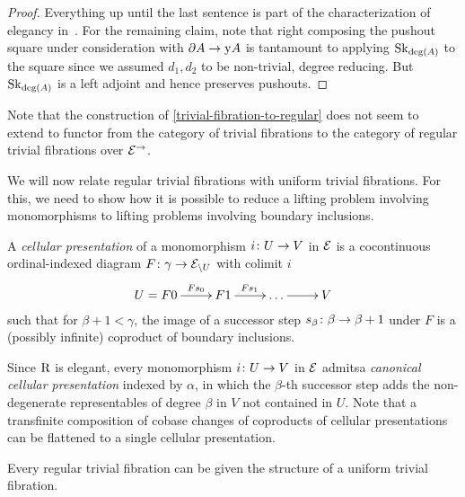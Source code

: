 \documentclass[reqno,10pt,a4paper,oneside,draft]{amsart}
\begin{document}
\begin{proof}
Everything up until the last sentence is part of the characterization of elegancy in~\cite[Proposition~3.8]{bergner-rezk-elegant}.
For the remaining claim, note that right composing the pushout square under consideration with $\partial A \to \mathrm{y} A$ is tantamount to applying $\operatorname{Sk}_{\deg(A)}$ to the square since we assumed $d_1, d_2$ to be non-trivial, \ie degree reducing.
But $\operatorname{Sk}_{\deg(A)}$ is a left adjoint and hence preserves pushouts.
\end{proof}

Note that the construction of \cref{trivial-fibration-to-regular} does not seem to extend to functor from the category of trivial fibrations to the category of regular trivial fibrations over $\mathcal{E}^{\to}$.

\medskip

We will now relate regular trivial fibrations with uniform trivial fibrations.
For this, we need to show how it is possible to reduce a lifting problem involving monomorphisms to lifting problems involving boundary inclusions.

\begin{definition} A \emph{cellular presentation} of a monomorphism $i \colon U \to V$ in $\mathcal{E}$ is a cocontinuous ordinal-indexed diagram $F \colon \gamma \to \mathcal{E}_{\backslash U}$ with colimit $i$
\[
\xymatrix{
  U = F 0
  \ar[r]^-{F s_0}
&
  F 1
  \ar[r]^{F s_1}
&
  \ldots
  \ar[r]
&
  V
}
\]
such that for $\beta + 1 < \gamma$, the image of a successor step $s_{\beta} \colon \beta \to \beta + 1$ under $F$ is a (possibly infinite) coproduct of boundary inclusions.
\end{definition}

Since $\mathrm{R}$ is elegant, every monomorphism $i \colon U \to V$ in $\mathcal{E}$ admitsa \emph{canonical cellular presentation} indexed by $\alpha$, in which the $\beta$-th successor step adds the non-degenerate representables of degree $\beta$ in $V$ not contained in $U$.
Note that a transfinite composition of cobase changes of coproducts of cellular presentations can be flattened to a single cellular presentation.

\begin{proposition} \label{regular-trivial-fibration-to-uniform}
Every regular trivial fibration can be given the structure of a uniform trivial fibration.
\end{proposition}
\end{document}
